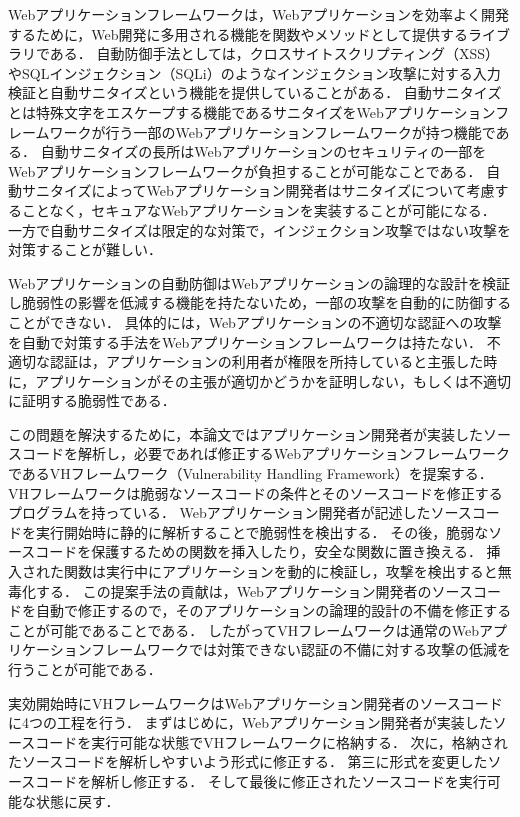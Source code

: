 \documentclass[a4paper,12pt]{jreport}
\begin{document}
Webアプリケーションフレームワークは，Webアプリケーションを効率よく開発するために，Web開発に多用される機能を関数やメソッドとして提供するライブラリである．
自動防御手法としては，クロスサイトスクリプティング（XSS）やSQLインジェクション（SQLi）のようなインジェクション攻撃に対する入力検証と自動サニタイズという機能を提供していることがある．
自動サニタイズとは特殊文字をエスケープする機能であるサニタイズをWebアプリケーションフレームワークが行う一部のWebアプリケーションフレームワークが持つ機能である．
自動サニタイズの長所はWebアプリケーションのセキュリティの一部をWebアプリケーションフレームワークが負担することが可能なことである．
自動サニタイズによってWebアプリケーション開発者はサニタイズについて考慮することなく，セキュアなWebアプリケーションを実装することが可能になる．
一方で自動サニタイズは限定的な対策で，インジェクション攻撃ではない攻撃を対策することが難しい．

Webアプリケーションの自動防御はWebアプリケーションの論理的な設計を検証し脆弱性の影響を低減する機能を持たないため，一部の攻撃を自動的に防御することができない．
具体的には，Webアプリケーションの不適切な認証への攻撃を自動で対策する手法をWebアプリケーションフレームワークは持たない．
不適切な認証は，アプリケーションの利用者が権限を所持していると主張した時に，アプリケーションがその主張が適切かどうかを証明しない，もしくは不適切に証明する脆弱性である．

この問題を解決するために，本論文ではアプリケーション開発者が実装したソースコードを解析し，必要であれば修正するWebアプリケーションフレームワークであるVHフレームワーク（Vulnerability Handling Framework）を提案する．
VHフレームワークは脆弱なソースコードの条件とそのソースコードを修正するプログラムを持っている．
Webアプリケーション開発者が記述したソースコードを実行開始時に静的に解析することで脆弱性を検出する．
その後，脆弱なソースコードを保護するための関数を挿入したり，安全な関数に置き換える．
挿入された関数は実行中にアプリケーションを動的に検証し，攻撃を検出すると無毒化する．
この提案手法の貢献は，Webアプリケーション開発者のソースコードを自動で修正するので，そのアプリケーションの論理的設計の不備を修正することが可能であることである．
したがってVHフレームワークは通常のWebアプリケーションフレームワークでは対策できない認証の不備に対する攻撃の低減を行うことが可能である．

実効開始時にVHフレームワークはWebアプリケーション開発者のソースコードに4つの工程を行う．
まずはじめに，Webアプリケーション開発者が実装したソースコードを実行可能な状態でVHフレームワークに格納する．
次に，格納されたソースコードを解析しやすいよう形式に修正する．
第三に形式を変更したソースコードを解析し修正する．
そして最後に修正されたソースコードを実行可能な状態に戻す．
\end{document}
